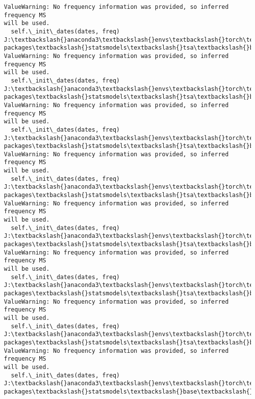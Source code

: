 \documentclass[11pt]{article}
\begin{document}
\begin{Verbatim}[commandchars=\\\{\}]
ValueWarning: No frequency information was provided, so inferred frequency MS
will be used.
  self.\_init\_dates(dates, freq)
J:\textbackslash{}anaconda3\textbackslash{}envs\textbackslash{}torch\textbackslash{}Lib\textbackslash{}site-packages\textbackslash{}statsmodels\textbackslash{}tsa\textbackslash{}base\textbackslash{}tsa\_model.py:473:
ValueWarning: No frequency information was provided, so inferred frequency MS
will be used.
  self.\_init\_dates(dates, freq)
J:\textbackslash{}anaconda3\textbackslash{}envs\textbackslash{}torch\textbackslash{}Lib\textbackslash{}site-packages\textbackslash{}statsmodels\textbackslash{}tsa\textbackslash{}base\textbackslash{}tsa\_model.py:473:
ValueWarning: No frequency information was provided, so inferred frequency MS
will be used.
  self.\_init\_dates(dates, freq)
J:\textbackslash{}anaconda3\textbackslash{}envs\textbackslash{}torch\textbackslash{}Lib\textbackslash{}site-packages\textbackslash{}statsmodels\textbackslash{}tsa\textbackslash{}base\textbackslash{}tsa\_model.py:473:
ValueWarning: No frequency information was provided, so inferred frequency MS
will be used.
  self.\_init\_dates(dates, freq)
J:\textbackslash{}anaconda3\textbackslash{}envs\textbackslash{}torch\textbackslash{}Lib\textbackslash{}site-packages\textbackslash{}statsmodels\textbackslash{}tsa\textbackslash{}base\textbackslash{}tsa\_model.py:473:
ValueWarning: No frequency information was provided, so inferred frequency MS
will be used.
  self.\_init\_dates(dates, freq)
J:\textbackslash{}anaconda3\textbackslash{}envs\textbackslash{}torch\textbackslash{}Lib\textbackslash{}site-packages\textbackslash{}statsmodels\textbackslash{}tsa\textbackslash{}base\textbackslash{}tsa\_model.py:473:
ValueWarning: No frequency information was provided, so inferred frequency MS
will be used.
  self.\_init\_dates(dates, freq)
J:\textbackslash{}anaconda3\textbackslash{}envs\textbackslash{}torch\textbackslash{}Lib\textbackslash{}site-packages\textbackslash{}statsmodels\textbackslash{}tsa\textbackslash{}base\textbackslash{}tsa\_model.py:473:
ValueWarning: No frequency information was provided, so inferred frequency MS
will be used.
  self.\_init\_dates(dates, freq)
J:\textbackslash{}anaconda3\textbackslash{}envs\textbackslash{}torch\textbackslash{}Lib\textbackslash{}site-packages\textbackslash{}statsmodels\textbackslash{}tsa\textbackslash{}base\textbackslash{}tsa\_model.py:473:
ValueWarning: No frequency information was provided, so inferred frequency MS
will be used.
  self.\_init\_dates(dates, freq)
J:\textbackslash{}anaconda3\textbackslash{}envs\textbackslash{}torch\textbackslash{}Lib\textbackslash{}site-packages\textbackslash{}statsmodels\textbackslash{}base\textbackslash{}model.py:607:

\end{Verbatim}
\end{document}
